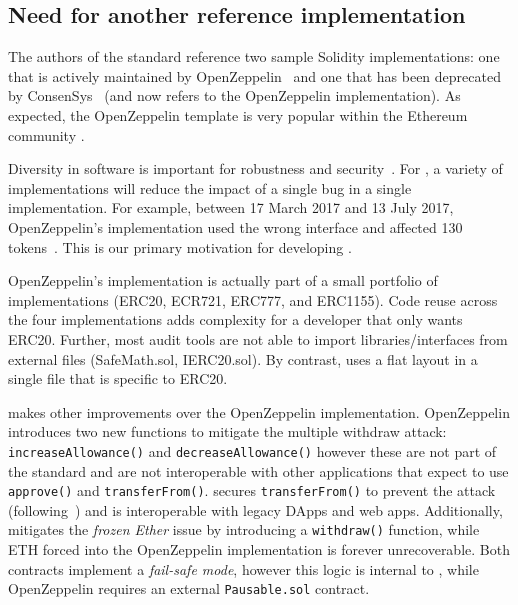 \subsection{Need for another reference implementation}

The authors of the \erc standard reference two sample Solidity implementations: one that is actively maintained by OpenZeppelin~\cite{OpenZepplin} and one that has been deprecated by ConsenSys~\cite{ConsensysToken} (and now refers to the OpenZeppelin implementation). As expected, the OpenZeppelin template is very popular within the Ethereum community \cite{OPZ1,OPZ2,OPZ3}.

Diversity in software is important for robustness and security~\cite{FSA97,FHS97}. For \erc, a variety of implementations will reduce the impact of a single bug in a single implementation. For example, between 17 March 2017 and 13 July 2017, OpenZeppelin's implementation used the wrong interface and affected 130 tokens~\cite{ErcBug}. This is our primary motivation for developing \sys.

OpenZeppelin's implementation is actually part of a small portfolio of implementations (ERC20, ECR721, ERC777, and ERC1155). Code reuse across the four implementations adds complexity for a developer that only wants ERC20. Further, most audit tools are not able to import libraries/interfaces from external files (\eg SafeMath.sol, IERC20.sol). By contrast, \sys uses a flat layout in a single file that is specific to ERC20.

\sys makes other improvements over the OpenZeppelin implementation. OpenZeppelin introduces two new functions to mitigate the multiple withdraw attack: \texttt{increaseAllowance()} and \texttt{decreaseAllowance()} however these are not part of the \sys standard and are not  interoperable with other applications that expect to use \texttt{approve()} and \texttt{transferFrom()}. \sys secures \texttt{transferFrom()} to prevent the attack (following~\cite{ERC20MWA}) and is interoperable with legacy DApps and web apps. Additionally, \sys mitigates the \textit{frozen Ether} issue by introducing a \texttt{withdraw()} function, while ETH forced into the OpenZeppelin implementation is forever unrecoverable. Both contracts implement a \textit{fail-safe mode}, however this logic is internal to \sys, while OpenZeppelin requires an external \texttt{Pausable.sol} contract.


